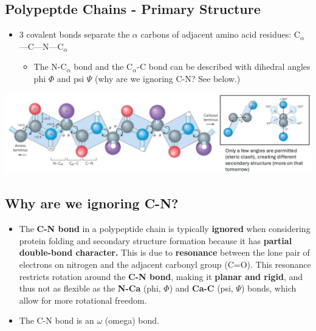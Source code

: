 \documentclass[10pt]{article}
\begin{document}
\subsection*{Polypeptde Chains - Primary Structure}
\begin{itemize}
    \item 3 covalent bonds separate the $\alpha$ carbons of adjacent amino acid residues: C$_\alpha$---C---N---C$_\alpha$
    \begin{itemize}
        \item The N-C$_\alpha$ bond and the C$_\alpha$-C bond can be described with dihedral angles phi $\Phi$ and psi $\Psi$ (why are we ignoring C-N?  See below.)
    \end{itemize}
\end{itemize}
\begin{center}
    \includegraphics*[width=\textwidth]{L4_8.png}
\end{center}
\subsection*{Why are we ignoring C-N?}
\begin{itemize}
    \item The \textbf{C-N bond} in a polypeptide chain is typically \textbf{ignored} when considering protein folding and secondary structure formation because it has \textbf{partial double-bond character.}  This is due to \textbf{resonance} between the lone pair of electrons on nitrogen and the adjacent carbonyl group (C=O).  This resonance restricts rotation around the \textbf{C-N bond}, making it \textbf{planar and rigid}, and thus not as flexible as the \textbf{N-Ca} (phi, $\Phi$) and \textbf{Ca-C} (psi, $\Psi$) bonds, which allow for more rotational freedom.
    \item The C-N bond is an $\omega$ (omega) bond.
\end{itemize}
\end{document}
